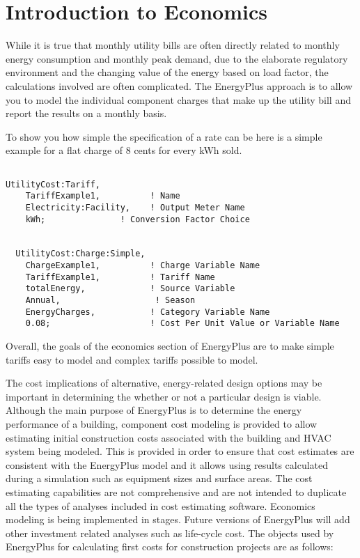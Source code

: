 \section{Introduction to Economics}\label{introduction-to-economics}

While it is true that monthly utility bills are often directly related to monthly energy consumption and monthly peak demand, due to the elaborate regulatory environment and the changing value of the energy based on load factor, the calculations involved are often complicated. The EnergyPlus approach is to allow you to model the individual component charges that make up the utility bill and report the results on a monthly basis.

To show you how simple the specification of a rate can be here is a simple example for a flat charge of 8 cents for every kWh sold.

\begin{lstlisting}

UtilityCost:Tariff,
    TariffExample1,          ! Name
    Electricity:Facility,    ! Output Meter Name
    kWh;               ! Conversion Factor Choice


  UtilityCost:Charge:Simple,
    ChargeExample1,          ! Charge Variable Name
    TariffExample1,          ! Tariff Name
    totalEnergy,             ! Source Variable
    Annual,                   ! Season
    EnergyCharges,           ! Category Variable Name
    0.08;                    ! Cost Per Unit Value or Variable Name
\end{lstlisting}

Overall, the goals of the economics section of EnergyPlus are to make simple tariffs easy to model and complex tariffs possible to model.

The cost implications of alternative, energy-related design options may be important in determining the whether or not a particular design is viable. Although the main purpose of EnergyPlus is to determine the energy performance of a building, component cost modeling is provided to allow estimating initial construction costs associated with the building and HVAC system being modeled. This is provided in order to ensure that cost estimates are consistent with the EnergyPlus model and it allows using results calculated during a simulation such as equipment sizes and surface areas. The cost estimating capabilities are not comprehensive and are not intended to duplicate all the types of analyses included in cost estimating software. Economics modeling is being implemented in stages. Future versions of EnergyPlus will add other investment related analyses such as life-cycle cost. The objects used by EnergyPlus for calculating first costs for construction projects are as follows:

